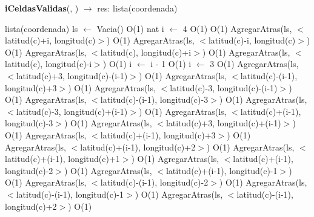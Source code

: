 \begin{Algoritmos}
\begin{algorithm}[H]{\textbf{iCeldasValidas}(, ) $\to$ res: lista(coordenada)}
	\begin{algorithmic}[1]
		\begin{scriptsize}
		\State lista(coordenada) ls $\gets$ Vacia() \Comment O(1)
		\State nat i $\gets$ 4 \Comment O(1)
		 \Comment O(1)
			\State AgregarAtras(ls, $<$latitud(c)+i, longitud(c)$>$) \Comment O(1)
				\State AgregarAtras(ls, $<$latitud(c)-i, longitud(c)$>$) \Comment O(1)
			\EndIf			
			\State AgregarAtras(ls, $<$latitud(c), longitud(c)+i$>$) \Comment O(1)
				\State AgregarAtras(ls, $<$latitud(c), longitud(c)-i$>$) \Comment O(1)
			\EndIf			
			\State i $\gets$ i - 1 \Comment O(1)
		\EndWhile
		\State i $\gets$ 3
		 \Comment O(1)
				\State AgregarAtras(ls, $<$latitud(c)+3, longitud(c)-(i-1)$>$) \Comment O(1)
			\EndIf
				\State AgregarAtras(ls, $<$latitud(c)-(i-1), longitud(c)+3$>$) \Comment O(1)
			\EndIf
				\State AgregarAtras(ls, $<$latitud(c)-3, longitud(c)-(i-1)$>$) \Comment O(1)
			\EndIf
				\State AgregarAtras(ls, $<$latitud(c)-(i-1), longitud(c)-3$>$) \Comment O(1)
			\EndIf
				\State AgregarAtras(ls, $<$latitud(c)-3, longitud(c)+(i-1)$>$) \Comment O(1)
			\EndIf
				\State AgregarAtras(ls, $<$latitud(c)+(i-1), longitud(c)-3$>$) \Comment O(1)
			\EndIf			
			\State AgregarAtras(ls, $<$latitud(c)+3, longitud(c)+(i-1)$>$) \Comment O(1)
			\State AgregarAtras(ls, $<$latitud(c)+(i-1), longitud(c)+3$>$) \Comment O(1)
			\State AgregarAtras(ls, $<$latitud(c)+(i-1), longitud(c)+2$>$) \Comment O(1)
			\State AgregarAtras(ls, $<$latitud(c)+(i-1), longitud(c)+1$>$) \Comment O(1)
				\State AgregarAtras(ls, $<$latitud(c)+(i-1), longitud(c)-2$>$) \Comment O(1)
			\EndIf
				\State AgregarAtras(ls, $<$latitud(c)+(i-1), longitud(c)-1$>$) \Comment O(1)
			\EndIf
				\State AgregarAtras(ls, $<$latitud(c)-(i-1), longitud(c)-2$>$) \Comment O(1)
			\EndIf
				\State AgregarAtras(ls, $<$latitud(c)-(i-1), longitud(c)-1$>$) \Comment O(1)
			\EndIf
				\State AgregarAtras(ls, $<$latitud(c)-(i-1), longitud(c)+2$>$) \Comment O(1)

\end{scriptsize}
\end{algorithmic}
\end{algorithm}
\end{Algoritmos}
